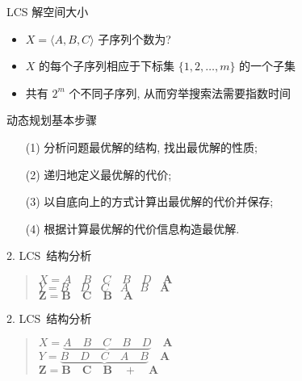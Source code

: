 \documentclass[fontset=fandol,UTF8,fleqn]{beamer}
\begin{document}
\begin{frame}{LCS 解空间大小}
  \begin{itemize}[<+-|alert@+>]
\item $X = \langle A, B, C\rangle$ 子序列个数为? 
\item  $X$ 的每个子序列相应于下标集 $\{1,2,\ldots, m\}$ 的一个子集 
\item 共有 $2^m$ 个不同子序列, 从而穷举搜索法需要指数时间 
\end{itemize}
\end{frame}

\begin{frame}{动态规划基本步骤}
  \begin{itemize}[<+-|alert@+>]
\item[(1)] 分析问题最优解的结构, 找出最优解的性质; 
\item[(2)] 递归地定义最优解的代价; 
\item[(3)] 以自底向上的方式计算出最优解的代价并保存; 
\item[(4)] 根据计算最优解的代价信息构造最优解. 
\end{itemize}
\end{frame}

\begin{frame}{2. LCS~结构分析}
\huge{
\begin{quote}
$ X = A\quad B \quad C \quad B \quad D \quad \mathbf{A}$   \\ \pause
\vspace*{.5cm}
$ Y = B\quad D \quad C \quad A \quad B \quad \mathbf{A}$   \\ \pause
\vspace*{1cm}
$\mathbf{ Z = B\quad C \quad B\quad A}$  \\ 
\end{quote}
}
\end{frame}

\begin{frame}{2. LCS~结构分析}
\huge{
\begin{quote}
$ X = \underbrace{A\quad B \quad C \quad B \quad D} \quad \mathbf{A}$
\\ \pause
\vspace*{.5cm}
$ Y = \underbrace{B\quad D \quad C \quad A \quad B} \quad \mathbf{A}$
\\ \pause
\vspace*{1cm}
$\mathbf{ Z = B\quad C \quad B\quad + \quad A}$  \\ 
\end{quote}
}
\end{frame}
\end{document}

